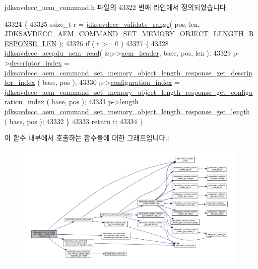 jdksavdecc\+\_\+aem\+\_\+command.\+h 파일의 43322 번째 라인에서 정의되었습니다.


\begin{DoxyCode}
43324 \{
43325     ssize\_t r = \hyperlink{group__util_ga9c02bdfe76c69163647c3196db7a73a1}{jdksavdecc\_validate\_range}( pos, len, 
      \hyperlink{group__command__set__memory__object__length__response_gaa96d65ba1f96e254f46f0bf883ff9525}{JDKSAVDECC\_AEM\_COMMAND\_SET\_MEMORY\_OBJECT\_LENGTH\_RESPONSE\_LEN}
       );
43326     \textcolor{keywordflow}{if} ( r >= 0 )
43327     \{
43328         \hyperlink{group__aecpdu__aem_gae2421015dcdce745b4f03832e12b4fb6}{jdksavdecc\_aecpdu\_aem\_read}( &p->\hyperlink{structjdksavdecc__aem__command__set__memory__object__length__response_ae1e77ccb75ff5021ad923221eab38294}{aem\_header}, base, pos, len );
43329         p->\hyperlink{structjdksavdecc__aem__command__set__memory__object__length__response_a042bbc76d835b82d27c1932431ee38d4}{descriptor\_index} = 
      \hyperlink{group__command__set__memory__object__length__response_gae2647ba54d0e05d4c4194a436606b035}{jdksavdecc\_aem\_command\_set\_memory\_object\_length\_response\_get\_descriptor\_index}
      ( base, pos );
43330         p->\hyperlink{structjdksavdecc__aem__command__set__memory__object__length__response_afaad1bd7c66f9611e134d8c5ce98f444}{configuration\_index} = 
      \hyperlink{group__command__set__memory__object__length__response_ga981d084ff9c8e992242d787271e36520}{jdksavdecc\_aem\_command\_set\_memory\_object\_length\_response\_get\_configuration\_index}
      ( base, pos );
43331         p->\hyperlink{structjdksavdecc__aem__command__set__memory__object__length__response_a190b76b1f3d5bd26920300e5f073739b}{length} = 
      \hyperlink{group__command__set__memory__object__length__response_ga5cd962cb047db9a38b577037eb5a5f9a}{jdksavdecc\_aem\_command\_set\_memory\_object\_length\_response\_get\_length}
      ( base, pos );
43332     \}
43333     \textcolor{keywordflow}{return} r;
43334 \}
\end{DoxyCode}


이 함수 내부에서 호출하는 함수들에 대한 그래프입니다.\+:
\nopagebreak
\begin{figure}[H]
\begin{center}
\leavevmode
\includegraphics[width=350pt]{group__command__set__memory__object__length__response_ga5b5c969f887f41bb95739ea32d528fa2_cgraph}
\end{center}
\end{figure}


